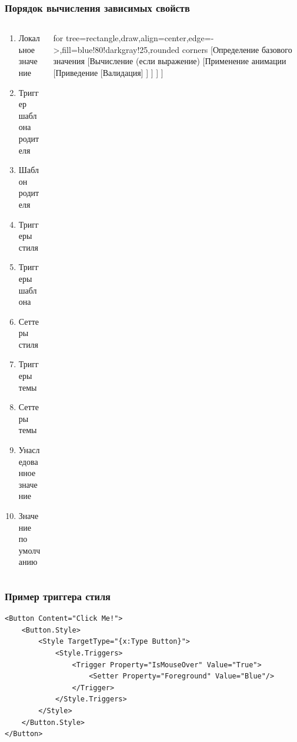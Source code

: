 \documentclass[xetex,mathserif,serif]{beamer}
\begin{document}
	\begin{frame}[fragile]
		\frametitle{Порядок вычисления зависимых свойств}
		\begin{columns}
			\begin{column}{0.5\textwidth}
				\begin{enumerate}
					\item Локальное значение
					\item Триггер шаблона родителя
					\item Шаблон родителя
					\item Триггеры стиля
					\item Триггеры шаблона
					\item Сеттеры стиля
					\item Триггеры темы
					\item Сеттеры темы
					\item Унаследованное значение
					\item Значение по умолчанию
				\end{enumerate}
			\end{column}
			\begin{column}{0.5\textwidth}
				\begin{footnotesize}
					\begin{forest}
						for tree={rectangle,draw,align=center,edge=->,fill=blue!80!darkgray!25,rounded corners}
						[Определение базового значения
							[Вычисление (если выражение)
								[Применение анимации
									[Приведение
										[Валидация]
									]
								]
							]
						]
					\end{forest}
				\end{footnotesize}
			\end{column}
		\end{columns}
	\end{frame}

	\begin{frame}[fragile]
		\frametitle{Пример триггера стиля}
		\begin{verbatim}
<Button Content="Click Me!">
    <Button.Style>
        <Style TargetType="{x:Type Button}">
            <Style.Triggers>
                <Trigger Property="IsMouseOver" Value="True">
                    <Setter Property="Foreground" Value="Blue"/>
                </Trigger>
            </Style.Triggers>
        </Style>
    </Button.Style>
</Button>
		\end{verbatim}
	\end{frame}
\end{document}
